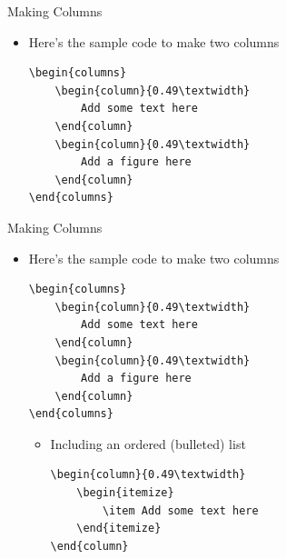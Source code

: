 \begin{frame}[fragile,t]{Making Columns}
	\begin{itemize}
		\item Here's the sample code to make two columns	
{\small
	\begin{lstlisting}
\begin{columns}
	\begin{column}{0.49\textwidth}
		Add some text here
	\end{column}
	\begin{column}{0.49\textwidth}
		Add a figure here
	\end{column}
\end{columns}
	\end{lstlisting}
}
	\end{itemize}
\end{frame}

\begin{frame}[fragile,t]{Making Columns}
	\begin{itemize}
		\item Here's the sample code to make two columns
{\small
	\begin{lstlisting}
\begin{columns}
	\begin{column}{0.49\textwidth}
		Add some text here
	\end{column}
	\begin{column}{0.49\textwidth}
		Add a figure here
	\end{column}
\end{columns}
	\end{lstlisting}
}
	\begin{itemize}
		\item Including an ordered (bulleted) list
{\small
	\begin{lstlisting}
\begin{column}{0.49\textwidth}
	\begin{itemize}
		\item Add some text here
	\end{itemize}
\end{column}
	\end{lstlisting}
}
	\end{itemize}
	\end{itemize}
\end{frame}

